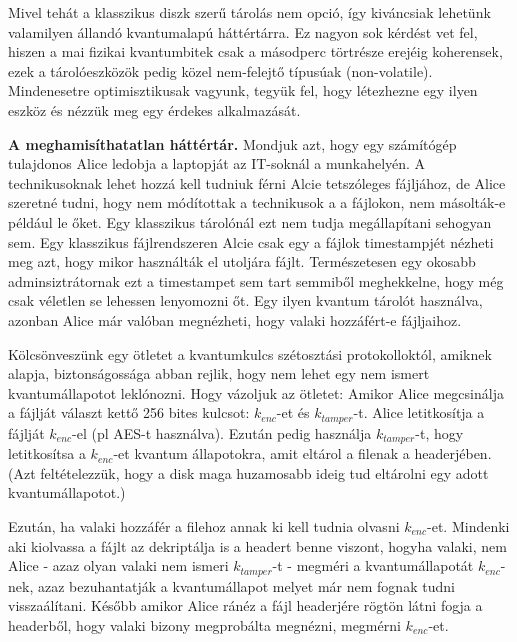 \indent Mivel tehát a klasszikus diszk szerű tárolás nem opció, így kiváncsiak lehetünk valamilyen állandó kvantumalapú háttértárra.
Ez nagyon sok kérdést vet fel, hiszen a mai fizikai kvantumbitek csak a másodperc törtrésze erejéig koherensek, ezek a tárolóeszközök pedig közel nem-felejtő típusúak (non-volatile).
Mindenesetre optimisztikusak vagyunk, tegyük fel, hogy létezhezne egy ilyen eszköz és nézzük meg egy érdekes alkalmazását.

\textbf{A meghamisíthatatlan háttértár.} Mondjuk azt, hogy egy számítógép tulajdonos Alice ledobja a laptopját az IT-soknál a munkahelyén.
A technikusoknak lehet hozzá kell tudniuk férni Alcie tetszóleges fájljához, de Alice szeretné tudni, hogy nem módítottak a technikusok a a fájlokon, nem másolták-e például le őket.
Egy klasszikus tárolónál ezt nem tudja megállapítani sehogyan sem.
Egy klasszikus fájlrendszeren Alcie csak egy a fájlok timestampjét nézheti meg azt, hogy mikor használták el utoljára fájlt.
Természetesen egy okosabb adminsiztrátornak ezt a timestampet sem tart semmiből meghekkelne, hogy még csak véletlen se lehessen lenyomozni őt.
Egy ilyen kvantum tárolót használva, azonban Alice már valóban megnézheti, hogy valaki hozzáfért-e fájljaihoz.

\indent Kölcsönveszünk egy ötletet a kvantumkulcs szétosztási protokolloktól, amiknek alapja, biztonságossága abban rejlik, hogy nem lehet egy nem ismert kvantumállapotot leklónozni.
Hogy vázoljuk az ötletet: Amikor Alice megcsinálja a fájlját választ kettő 256 bites kulcsot: $k_{enc}$-et és $k_{tamper}$-t.
Alice letitkosítja a fájlját $k_{enc}$-el (pl AES-t használva). Ezután pedig használja $k_{tamper}$-t, hogy letitkosítsa a $k_{enc}$-et kvantum állapotokra, amit eltárol a filenak a headerjében.
(Azt feltételezzük, hogy a disk maga huzamosabb ideig tud eltárolni egy adott kvantumállapotot.)

\indent Ezután, ha valaki hozzáfér a filehoz annak ki kell tudnia olvasni $k_{enc}$-et.
Mindenki aki kiolvassa a fájlt az dekriptálja is a headert benne viszont, hogyha valaki, nem Alice - azaz olyan valaki nem ismeri $k_{tamper}$-t - megméri a kvantumállapotát $k_{enc}$-nek, azaz bezuhantatják a kvantumállapot melyet már nem fognak tudni visszaálítani.
Később amikor Alice ránéz a fájl headerjére rögtön látni fogja a headerből, hogy valaki bizony megprobálta megnézni, megmérni $k_{enc}$-et.
